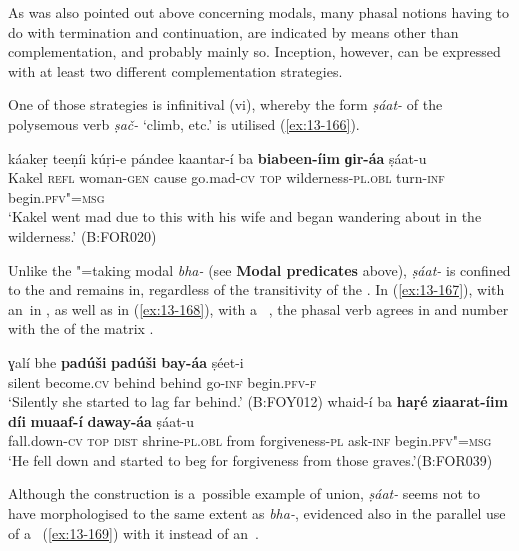  As was also pointed out above concerning modals, many phasal notions having to do with termination and continuation, are indicated by means other than complementation, and probably mainly so. Inception, however, can be expressed with at least two different complementation strategies.


One of those strategies is infinitival (vi), whereby the  form \textit{ṣáat-} of the polysemous verb \textit{ṣač-} `climb, etc.' is utilised (\ref{ex:13-166}). 

\ea\label{ex:13-166}
\gll káakeṛ teeṇíi kúṛi-e pándee kaantar-í ba  \textbf{biabeen-íim} \textbf{ɡir-áa} ṣáat-u \\
Kakel \textsc{ refl} woman-\textsc{gen} cause go.mad-\textsc{cv} \textsc{top} wilderness-\textsc{pl.obl} turn-\textsc{inf} begin.\textsc{pfv"=msg} \\
\glt `Kakel went mad due to this with his wife and began wandering about in the wilderness.' (B:FOR020) 
\z

Unlike the "=taking modal \textit{bha-} (see \textbf{Modal predicates} above), \textit{ṣáat-} is confined to the  and remains in, regardless of the transitivity of the  . In (\ref{ex:13-167}), with an~in , as well as in (\ref{ex:13-168}), with a~ , the phasal verb agrees in  and number with the  of the matrix .

\ea
\label{ex:13-167}
\gll ɣalí bhe \textbf{padúši} \textbf{padúši} \textbf{bay-áa} ṣéet-i  \\
silent become.\textsc{cv} behind behind go-\textsc{inf} begin.\textsc{pfv-f} \\
\glt `Silently she started to lag far behind.' (B:FOY012)
\ex
\label{ex:13-168}
\gll whaid-í ba \textbf{haṛé} \textbf{ziaarat-íim} \textbf{díi} \textbf{muaaf-í} \textbf{daway-áa} ṣáat-u\\
fall.down-\textsc{cv} \textsc{top} \textsc{dist} shrine-\textsc{pl.obl} from forgiveness-\textsc{pl} ask-\textsc{inf} begin.\textsc{pfv"=msg}\\
\glt `He fell down and started to beg for forgiveness from those graves.'\newline (B:FOR039) 
\z

Although the construction is a~possible example of  union, \textit{ṣáat-} seems not to have morphologised to the same extent as \textit{bha-}, evidenced also in the parallel use of a~ (\ref{ex:13-169}) with it instead of an~. 

